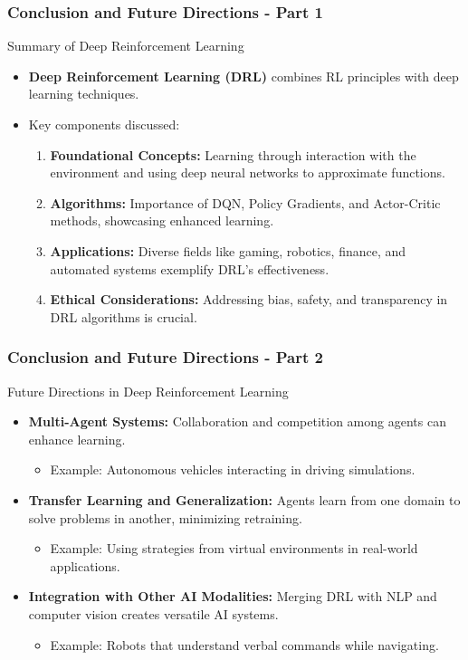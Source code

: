 \documentclass[aspectratio=169]{beamer}
\begin{document}
\begin{frame}[fragile]
  \frametitle{Conclusion and Future Directions - Part 1}
  \begin{block}{Summary of Deep Reinforcement Learning}
    \begin{itemize}
      \item \textbf{Deep Reinforcement Learning (DRL)} combines RL principles with deep learning techniques.
      \item Key components discussed:
        \begin{enumerate}
          \item \textbf{Foundational Concepts:} Learning through interaction with the environment and using deep neural networks to approximate functions.
          \item \textbf{Algorithms:} Importance of DQN, Policy Gradients, and Actor-Critic methods, showcasing enhanced learning.
          \item \textbf{Applications:} Diverse fields like gaming, robotics, finance, and automated systems exemplify DRL's effectiveness.
          \item \textbf{Ethical Considerations:} Addressing bias, safety, and transparency in DRL algorithms is crucial.
        \end{enumerate}
    \end{itemize}
  \end{block}
\end{frame}

\begin{frame}[fragile]
  \frametitle{Conclusion and Future Directions - Part 2}
  \begin{block}{Future Directions in Deep Reinforcement Learning}
    \begin{itemize}
      \item \textbf{Multi-Agent Systems:} Collaboration and competition among agents can enhance learning. 
        \begin{itemize}
          \item Example: Autonomous vehicles interacting in driving simulations.
        \end{itemize}
      \item \textbf{Transfer Learning and Generalization:} Agents learn from one domain to solve problems in another, minimizing retraining.
        \begin{itemize}
          \item Example: Using strategies from virtual environments in real-world applications.
        \end{itemize}
      \item \textbf{Integration with Other AI Modalities:} Merging DRL with NLP and computer vision creates versatile AI systems.
        \begin{itemize}
          \item Example: Robots that understand verbal commands while navigating.
        \end{itemize}
    \end{itemize}
  \end{block}
\end{frame}
\end{document}

